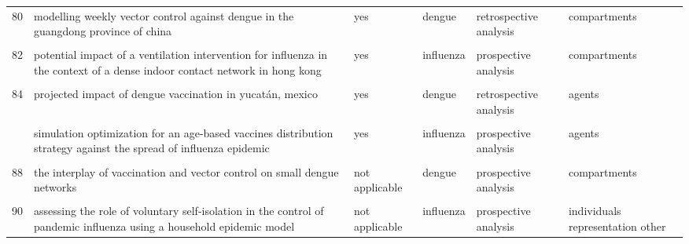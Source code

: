 \documentclass[
]{article}
\begin{document}
\begin{landscape}
\begin{longtable}{l>{\raggedright\arraybackslash}p{3.3cm}l>{\raggedright\arraybackslash}p{3.3cm}>{\raggedright\arraybackslash}p{2cm}l}
80 & modelling weekly vector control against dengue in the guangdong province of china & yes & dengue & retrospective analysis & compartments\\
\addlinespace
\cellcolor{gray!6}{81} & \cellcolor{gray!6}{optimal control strategies for the spread of ebola in west africa} & \cellcolor{gray!6}{no} & \cellcolor{gray!6}{ebola} & \cellcolor{gray!6}{prospective analysis} & \cellcolor{gray!6}{compartments}\\
82 & potential impact of a ventilation intervention for influenza in the context of a dense indoor contact network in hong kong & yes & influenza & prospective analysis & compartments\\
\cellcolor{gray!6}{83} & \cellcolor{gray!6}{predicting and evaluating the epidemic trend of ebola virus disease in the 2014-2015 outbreak and the effects of intervention measures} & \cellcolor{gray!6}{no} & \cellcolor{gray!6}{ebola} & \cellcolor{gray!6}{retrospective analysis} & \cellcolor{gray!6}{compartments}\\
84 & projected impact of dengue vaccination in yucatán, mexico & yes & dengue & retrospective analysis & agents\\
\cellcolor{gray!6}{85} & \cellcolor{gray!6}{seasonality and the effectiveness of mass vaccination} & \cellcolor{gray!6}{not applicable} & \cellcolor{gray!6}{dengue influenza} & \cellcolor{gray!6}{prospective analysis} & \cellcolor{gray!6}{compartments}\\
\addlinespace
86 & simulation optimization for an age-based vaccines distribution strategy against the spread of influenza epidemic & yes & influenza & prospective analysis & agents\\
\cellcolor{gray!6}{87} & \cellcolor{gray!6}{spatiotemporal dynamics of the ebola epidemic in guinea and implications for vaccination and disease elimination: a computational modeling analysis} & \cellcolor{gray!6}{no} & \cellcolor{gray!6}{ebola} & \cellcolor{gray!6}{retrospective analysis} & \cellcolor{gray!6}{agents}\\
88 & the interplay of vaccination and vector control on small dengue networks & not applicable & dengue & prospective analysis & compartments\\
\cellcolor{gray!6}{89} & \cellcolor{gray!6}{an epidemic patchy model with entry–exit screening} & \cellcolor{gray!6}{not applicable} & \cellcolor{gray!6}{influenza} & \cellcolor{gray!6}{prospective analysis} & \cellcolor{gray!6}{compartments}\\
90 & assessing the role of voluntary self-isolation in the control of pandemic influenza using a household epidemic model & not applicable & influenza & prospective analysis & individuals representation other\\

\end{longtable}
\end{landscape}
\end{document}
